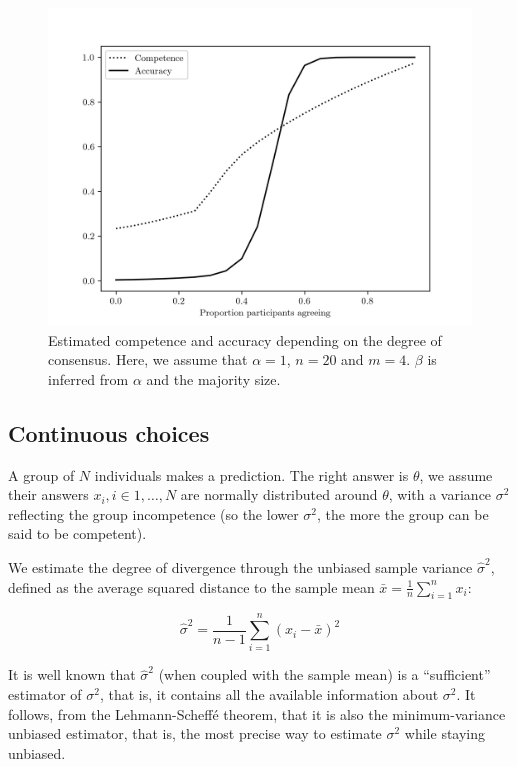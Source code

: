 \documentclass[
  doc,floatsintext]{apa6}
\begin{document}
\begin{figure}

\includegraphics[width=0.75\linewidth]{figures/Benoit_accuracy} \hfill{}

\caption{Estimated competence and accuracy depending on the degree of consensus. Here, we assume that \(\alpha=1\), \(n=20\) and \(m=4\). \(\beta\) is inferred from \(\alpha\) and the majority size.}\label{fig:accuracy}
\end{figure}

\subsection{Continuous choices}\label{continuous-choices}

A group of \(N\) individuals makes a prediction. The right answer is \(\theta\), we assume their answers \(x_i, i \in 1,…,N\) are normally distributed around \(\theta\), with a variance \(\sigma^2\) reflecting the group incompetence (so the lower \(\sigma^2\), the more the group can be said to be competent).

We estimate the degree of divergence through the unbiased sample variance \(\hat \sigma^2\), defined as the average squared distance to the sample mean \(\bar x =\frac 1 n \sum_{i=1}^n x_i\):

\[\hat \sigma^2 = \frac 1 {n-1} \sum_{i=1}^n (x_i - \bar x)^2\]

It is well known that \(\hat \sigma^2\) (when coupled with the sample mean) is a ``sufficient'' estimator of \(\sigma^2\), that is, it contains all the available information about \(\sigma^2\). It follows, from the Lehmann-Scheffé theorem, that it is also the minimum-variance unbiased estimator, that is, the most precise way to estimate \(\sigma^2\) while staying unbiased.
\end{document}
